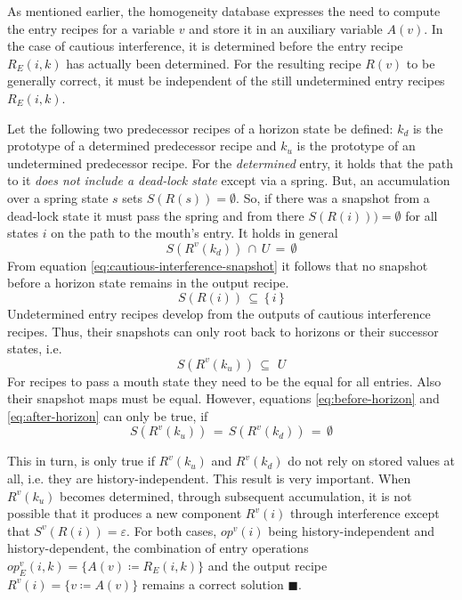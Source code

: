 \documentclass[12pt,a4paper]{scrartcl}
\begin{document}
As mentioned earlier, the homogeneity database expresses the need to compute
the entry recipes for a variable $v$ and store it in an auxiliary variable
$A(v)$. In the case of cautious interference, it is determined before the entry
recipe $R_E(i,k)$ has actually been determined.  For the resulting recipe
$R(v)$ to be generally correct, it must be independent of the still
undetermined entry recipes $R_E(i,k)$. 

Let the following two predecessor recipes of a horizon state be defined:
$k_d$ is the prototype of a determined predecessor recipe and $k_u$ is the
prototype of an undetermined predecessor recipe. For the \textit{determined}
entry, it holds that the path to it \textit{does not include a dead-lock state}
except via a spring. But, an accumulation over a spring state $s$ sets
$S(R(s))=\emptyset$. So, if there was a snapshot from a dead-lock state it must
pass the spring and from there $S(R(i)))=\emptyset$ for all states $i$ on the
path to the mouth's entry. It holds in general
\begin{equation} \label{eq:before-horizon}
        S(R^v(k_d))\,\cap\,U\,=\,\emptyset
\end{equation}
From equation \eqref{eq:cautious-interference-snapshot} it follows that no
snapshot before a horizon state remains in the output recipe.
\begin{equation}
        S(R(i))\,\subseteq\,\{\,i\,\}
\end{equation}
Undetermined entry recipes develop from the outputs of cautious interference 
recipes. Thus, their snapshots can only root back to horizons or their successor
states, i.e.
\begin{equation} \label{eq:after-horizon}
        S(R^v(k_u))\,\subseteq\,\,U
\end{equation}
For recipes to pass a mouth state they need to be the equal for all entries. Also
their snapshot maps must be equal. However, equations
\eqref{eq:before-horizon} and \eqref{eq:after-horizon} can only be true, if
\begin{equation} \label{eq:homogeneity-condition}
    S(R^v(k_u))\,=\,S(R^v(k_d))\,=\,\emptyset 
\end{equation}

This in turn, is only true if $R^v(k_u)$ and $R^v(k_d)$ do not rely on stored
values at all, i.e. they are history-independent. This result is very important. When
$R^v(k_u)$ becomes determined, through subsequent accumulation, it is not
possible that it produces a new component $R^v(i)$ through interference except
that $S^v(R(i))=\varepsilon$.  For both cases, $op^v(i)$ being history-independent and
history-dependent, the combination of entry operations $op^v_E(i,k) = \{ A(v)
\coloneqq R_E(i,k) \}$ and the output recipe $R^v(i)=\{ v\coloneqq A(v) \}$
remains a correct solution $\blacksquare$.  
\end{document}
